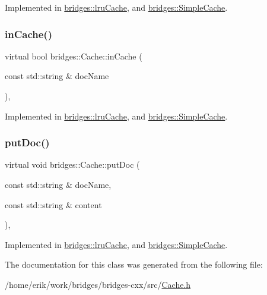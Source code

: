 Implemented in \hyperlink{classbridges_1_1lru_cache_ac8bed8ab7cbf002a23573c071ba04ad6}{bridges\+::lru\+Cache}, and \hyperlink{classbridges_1_1_simple_cache_a905ad2e7fb1b6784a5f70caf024b157f}{bridges\+::\+Simple\+Cache}.

\mbox{\label{classbridges_1_1_cache_abf3601225841d14dcd5611cd6a223ba4}} 
\subsubsection{\texorpdfstring{in\+Cache()}{inCache()}}
{\footnotesize\ttfamily virtual bool bridges\+::\+Cache\+::in\+Cache (\begin{DoxyParamCaption}\item[{const std\+::string \&}]{doc\+Name }\end{DoxyParamCaption})\hspace{0.3cm}{\ttfamily [pure virtual]}, {\ttfamily [noexcept]}}



Implemented in \hyperlink{classbridges_1_1lru_cache_ab56c75166ddcc3d17e6924e581f7a4e8}{bridges\+::lru\+Cache}, and \hyperlink{classbridges_1_1_simple_cache_a9af328045bad7c3bd4ed6cf99352bf07}{bridges\+::\+Simple\+Cache}.

\mbox{\label{classbridges_1_1_cache_ae74225542568a377fdcaf0354e466954}} 
\subsubsection{\texorpdfstring{put\+Doc()}{putDoc()}}
{\footnotesize\ttfamily virtual void bridges\+::\+Cache\+::put\+Doc (\begin{DoxyParamCaption}\item[{const std\+::string \&}]{doc\+Name,  }\item[{const std\+::string \&}]{content }\end{DoxyParamCaption})\hspace{0.3cm}{\ttfamily [pure virtual]}, {\ttfamily [noexcept]}}



Implemented in \hyperlink{classbridges_1_1lru_cache_a927fa1186ba830717ce11898c2beb4c7}{bridges\+::lru\+Cache}, and \hyperlink{classbridges_1_1_simple_cache_a61264b1080a4458d6210c7cf6b4e8615}{bridges\+::\+Simple\+Cache}.



The documentation for this class was generated from the following file\+:\begin{DoxyCompactItemize}
\item 
/home/erik/work/bridges/bridges-\/cxx/src/\hyperlink{_cache_8h}{Cache.\+h}\end{DoxyCompactItemize}
